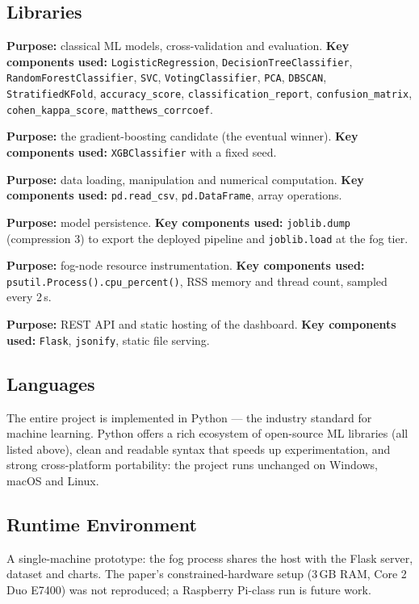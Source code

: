 \documentclass[12pt,a4paper]{article}
\begin{document}
\subsection{Libraries}
\begin{description}[leftmargin=1em,style=nextline]
  \item[Scikit-learn] \textbf{Purpose:} classical ML models, cross-validation and
    evaluation. \textbf{Key components used:} \texttt{LogisticRegression},
    \texttt{DecisionTreeClassifier}, \texttt{RandomForestClassifier}, \texttt{SVC},
    \texttt{VotingClassifier}, \texttt{PCA}, \texttt{DBSCAN},
    \texttt{StratifiedKFold}, \texttt{accuracy\_score},
    \texttt{classification\_report}, \texttt{confusion\_matrix},
    \texttt{cohen\_kappa\_score}, \texttt{matthews\_corrcoef}.
  \item[XGBoost] \textbf{Purpose:} the gradient-boosting candidate (the eventual
    winner). \textbf{Key components used:} \texttt{XGBClassifier} with a fixed seed.
  \item[Pandas \& NumPy] \textbf{Purpose:} data loading, manipulation and numerical
    computation. \textbf{Key components used:} \texttt{pd.read\_csv},
    \texttt{pd.DataFrame}, array operations.
  \item[Joblib] \textbf{Purpose:} model persistence. \textbf{Key components used:}
    \texttt{joblib.dump} (compression 3) to export the deployed pipeline and
    \texttt{joblib.load} at the fog tier.
  \item[Psutil] \textbf{Purpose:} fog-node resource instrumentation. \textbf{Key
    components used:} \texttt{psutil.Process().cpu\_percent()}, RSS memory and
    thread count, sampled every 2\,s.
  \item[Flask] \textbf{Purpose:} REST API and static hosting of the dashboard.
    \textbf{Key components used:} \texttt{Flask}, \texttt{jsonify}, static file
    serving.
\end{description}

\subsection{Languages}
The entire project is implemented in Python --- the industry standard for machine
learning. Python offers a rich ecosystem of open-source ML libraries (all listed
above), clean and readable syntax that speeds up experimentation, and strong
cross-platform portability: the project runs unchanged on Windows, macOS and Linux.

\subsection{Runtime Environment}
A single-machine prototype: the fog process shares the host with the Flask server,
dataset and charts. The paper's constrained-hardware setup (3\,GB RAM, Core 2 Duo
E7400) was not reproduced; a Raspberry Pi-class run is future work.
\end{document}
